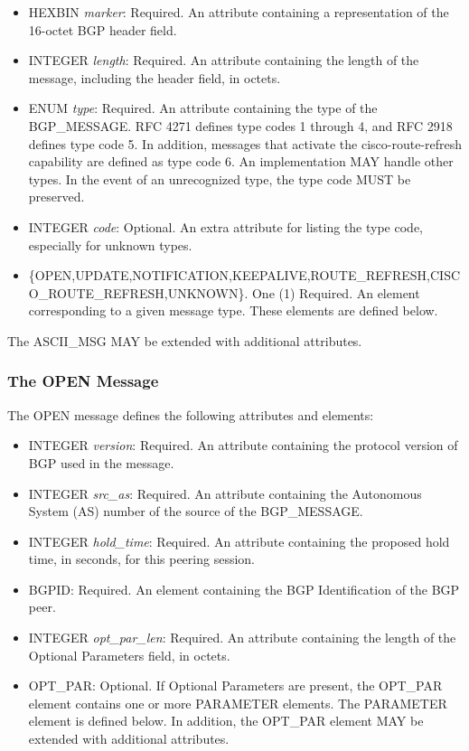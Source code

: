 \documentclass{article}
\begin{document}
\begin{itemize}
\item{HEXBIN \emph{marker}: Required. An attribute containing a representation of the 16-octet BGP header field.}
\item{INTEGER \emph{length}: Required. An attribute containing the length of the message, including the header field, in octets.}
\item{ENUM \emph{type}: Required. An attribute containing the type of the BGP_MESSAGE.  RFC 4271 defines type codes 1 through 4, and RFC 2918 defines type code 5.  In addition, messages that activate the cisco-route-refresh capability are defined as type code 6.  An implementation MAY handle other types.  In the event of an unrecognized type, the type code MUST be preserved.}
\item{INTEGER \emph{code}: Optional. An extra attribute for listing the type code, especially for unknown types.}
\item{\{OPEN,UPDATE,NOTIFICATION,KEEPALIVE,ROUTE_REFRESH,CISCO_ROUTE_REFRESH,UNKNOWN\}.  One (1) Required. An element corresponding to a given message type.  These elements are defined below.}
\end{itemize}

The ASCII_MSG MAY be extended with additional attributes.

\subsubsection{The OPEN Message}
\label{OPEN}
The OPEN message defines the following attributes and elements:

\begin{itemize}
\item{INTEGER \emph{version}: Required. An attribute containing the protocol version of BGP used in the message.}
\item{INTEGER \emph{src_as}: Required. An attribute containing the Autonomous System (AS) number of the source of the BGP_MESSAGE.}
\item{INTEGER \emph{hold_time}: Required. An attribute containing the proposed hold time, in seconds, for this peering session.}
\item{BGPID: Required. An element containing the BGP Identification of the BGP peer.}
\item{INTEGER \emph{opt_par_len}: Required. An attribute containing the length of the Optional Parameters field, in octets.}
\item{OPT_PAR: Optional. If Optional Parameters are present, the OPT_PAR element contains one or more PARAMETER elements.  The PARAMETER element is defined below.  In addition, the OPT_PAR element MAY be extended with additional attributes.}
\end{itemize}
\end{document}
